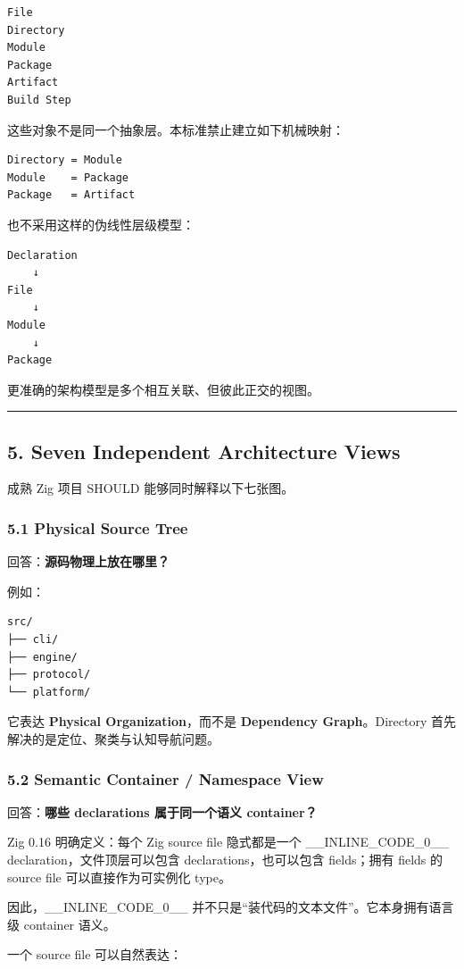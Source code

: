 \documentclass[11pt,a4paper]{article}
\begin{document}
\begin{lstlisting}[language=text]
File
Directory
Module
Package
Artifact
Build Step
\end{lstlisting}
这些对象不是同一个抽象层。本标准禁止建立如下机械映射：

\begin{lstlisting}[language=text]
Directory = Module
Module    = Package
Package   = Artifact
\end{lstlisting}
也不采用这样的伪线性层级模型：

\begin{lstlisting}[language=text]
Declaration
    ↓
File
    ↓
Module
    ↓
Package
\end{lstlisting}
更准确的架构模型是多个相互关联、但彼此正交的视图。

\vspace{0.5em}\hrule\vspace{0.5em}
\subsection{5. Seven Independent Architecture Views}
成熟 Zig 项目 SHOULD 能够同时解释以下七张图。

\subsubsection{5.1 Physical Source Tree}
回答：\textbf{源码物理上放在哪里？}

例如：

\begin{lstlisting}[language=text]
src/
├── cli/
├── engine/
├── protocol/
└── platform/
\end{lstlisting}
它表达 \textbf{Physical Organization}，而不是 \textbf{Dependency Graph}。Directory 首先解决的是定位、聚类与认知导航问题。

\subsubsection{5.2 Semantic Container / Namespace View}
回答：\textbf{哪些 declarations 属于同一个语义 container？}

Zig 0.16 明确定义：每个 Zig source file 隐式都是一个 \_\_INLINE\_CODE\_0\_\_ declaration，文件顶层可以包含 declarations，也可以包含 fields；拥有 fields 的 source file 可以直接作为可实例化 type。

因此，\_\_INLINE\_CODE\_0\_\_ 并不只是“装代码的文本文件”。它本身拥有语言级 container 语义。

一个 source file 可以自然表达：
\end{document}
